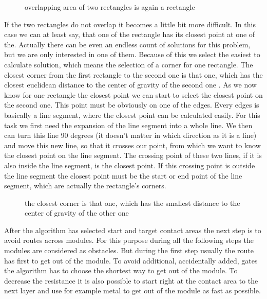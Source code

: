 \begin{figure}
	\centering
	
  	\caption{overlapping area of two rectangles is again a rectangle}
	\label{fig:rectangles_overlapping}
\end{figure}

If the two rectangles do not overlap it becomes a little bit more difficult. In this case we can at least say, that one of the rectangle has its closest point at one of the. Actually there can be even an endless count of solutions for this problem, but we are only interested in one of them. Because of this we select the easiest to calculate solution, which means the selection of a corner for one rectangle. The closest corner from the first rectangle to the second one is that one, which has the closest euclidean distance to the center of gravity of the second one . As we now know for one rectangle the closest point we can start to select the closest point on the second one. This point must be obviously on one of the edges. Every edges is basically a line segment, where the closest point can be calculated easily. For this task we first need the expansion of the line segment into a whole line. We then can turn this line 90 degrees (it doesn't matter in which direction as it is a line) and move this new line, so that it crosses our point, from which we want to know the closest point on the line segment. The crossing point of these two lines, if it is also inside the line segment, is the closest point. If this crossing point is outside the line segment the closest point must be the start or end point of the line segment, which are actually the rectangle's corners.

\begin{figure}
	\centering
	
  	\caption{the closest corner is that one, which has the smallest distance to the center of gravity of the other one}
	\label{fig:rectangles_closest_corner}
\end{figure}

After the algorithm has selected start and target contact areas the next step is to avoid routes across modules. For this purpose during all the following steps the modules are considered as obstacles. But during the first step usually the route has first to get out of the module. To avoid additional, accidentally added, gates the algorithm has to choose the shortest way to get out of the module. To decrease the resistance it is also possible to start right at the contact area to the next layer and use for example metal to get out of the module as fast as possible.

